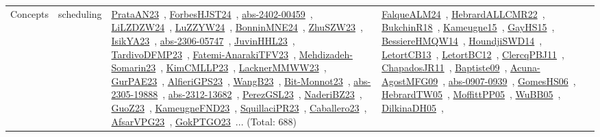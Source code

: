 {\begin{longtable}{lp{3cm}>{\raggedright\arraybackslash}p{6cm}>{\raggedright\arraybackslash}p{6cm}>{\raggedright\arraybackslash}p{8cm}}
Concepts & scheduling & \href{../works/PrataAN23.pdf}{PrataAN23}~\cite{PrataAN23}, \href{../works/ForbesHJST24.pdf}{ForbesHJST24}~\cite{ForbesHJST24}, \href{../works/abs-2402-00459.pdf}{abs-2402-00459}~\cite{abs-2402-00459}, \href{../works/LiLZDZW24.pdf}{LiLZDZW24}~\cite{LiLZDZW24}, \href{../works/LuZZYW24.pdf}{LuZZYW24}~\cite{LuZZYW24}, \href{../works/BonninMNE24.pdf}{BonninMNE24}~\cite{BonninMNE24}, \href{../works/ZhuSZW23.pdf}{ZhuSZW23}~\cite{ZhuSZW23}, \href{../works/IsikYA23.pdf}{IsikYA23}~\cite{IsikYA23}, \href{../works/abs-2306-05747.pdf}{abs-2306-05747}~\cite{abs-2306-05747}, \href{../works/JuvinHHL23.pdf}{JuvinHHL23}~\cite{JuvinHHL23}, \href{../works/TardivoDFMP23.pdf}{TardivoDFMP23}~\cite{TardivoDFMP23}, \href{../works/Fatemi-AnarakiTFV23.pdf}{Fatemi-AnarakiTFV23}~\cite{Fatemi-AnarakiTFV23}, \href{../works/Mehdizadeh-Somarin23.pdf}{Mehdizadeh-Somarin23}~\cite{Mehdizadeh-Somarin23}, \href{../works/KimCMLLP23.pdf}{KimCMLLP23}~\cite{KimCMLLP23}, \href{../works/LacknerMMWW23.pdf}{LacknerMMWW23}~\cite{LacknerMMWW23}, \href{../works/GurPAE23.pdf}{GurPAE23}~\cite{GurPAE23}, \href{../works/AlfieriGPS23.pdf}{AlfieriGPS23}~\cite{AlfieriGPS23}, \href{../works/WangB23.pdf}{WangB23}~\cite{WangB23}, \href{../works/Bit-Monnot23.pdf}{Bit-Monnot23}~\cite{Bit-Monnot23}, \href{../works/abs-2305-19888.pdf}{abs-2305-19888}~\cite{abs-2305-19888}, \href{../works/abs-2312-13682.pdf}{abs-2312-13682}~\cite{abs-2312-13682}, \href{../works/PerezGSL23.pdf}{PerezGSL23}~\cite{PerezGSL23}, \href{../works/NaderiBZ23.pdf}{NaderiBZ23}~\cite{NaderiBZ23}, \href{../works/GuoZ23.pdf}{GuoZ23}~\cite{GuoZ23}, \href{../works/KameugneFND23.pdf}{KameugneFND23}~\cite{KameugneFND23}, \href{../works/SquillaciPR23.pdf}{SquillaciPR23}~\cite{SquillaciPR23}, \href{../works/Caballero23.pdf}{Caballero23}~\cite{Caballero23}, \href{../works/AfsarVPG23.pdf}{AfsarVPG23}~\cite{AfsarVPG23}, \href{../works/GokPTGO23.pdf}{GokPTGO23}~\cite{GokPTGO23}... (Total: 688) & \href{../works/FalqueALM24.pdf}{FalqueALM24}~\cite{FalqueALM24}, \href{../works/HebrardALLCMR22.pdf}{HebrardALLCMR22}~\cite{HebrardALLCMR22}, \href{../works/BukchinR18.pdf}{BukchinR18}~\cite{BukchinR18}, \href{../works/Kameugne15.pdf}{Kameugne15}~\cite{Kameugne15}, \href{../works/GayHS15.pdf}{GayHS15}~\cite{GayHS15}, \href{../works/BessiereHMQW14.pdf}{BessiereHMQW14}~\cite{BessiereHMQW14}, \href{../works/HoundjiSWD14.pdf}{HoundjiSWD14}~\cite{HoundjiSWD14}, \href{../works/LetortCB13.pdf}{LetortCB13}~\cite{LetortCB13}, \href{../works/LetortBC12.pdf}{LetortBC12}~\cite{LetortBC12}, \href{../works/ClercqPBJ11.pdf}{ClercqPBJ11}~\cite{ClercqPBJ11}, \href{../works/ChapadosJR11.pdf}{ChapadosJR11}~\cite{ChapadosJR11}, \href{../works/Baptiste09.pdf}{Baptiste09}~\cite{Baptiste09}, \href{../works/Acuna-AgostMFG09.pdf}{Acuna-AgostMFG09}~\cite{Acuna-AgostMFG09}, \href{../works/abs-0907-0939.pdf}{abs-0907-0939}~\cite{abs-0907-0939}, \href{../works/GomesHS06.pdf}{GomesHS06}~\cite{GomesHS06}, \href{../works/HebrardTW05.pdf}{HebrardTW05}~\cite{HebrardTW05}, \href{../works/MoffittPP05.pdf}{MoffittPP05}~\cite{MoffittPP05}, \href{../works/WuBB05.pdf}{WuBB05}~\cite{WuBB05}, \href{../works/DilkinaDH05.pdf}{DilkinaDH05}~\cite{DilkinaDH05}, 
\end{longtable}}
